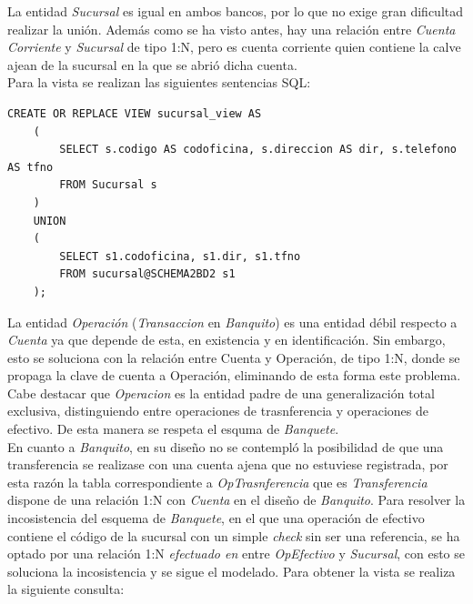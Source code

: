 \documentclass{article}
\begin{document}
La entidad \textit{Sucursal} es igual en ambos bancos, por lo que no exige gran dificultad realizar la unión. 
Además como se ha visto antes, hay una relación entre \textit{Cuenta Corriente} y \textit{Sucursal} de tipo 1:N, pero es cuenta corriente quien contiene la calve ajean de la sucursal en la que se abrió dicha cuenta.\\
Para la vista se realizan las siguientes sentencias SQL:
\begin{lstlisting}
CREATE OR REPLACE VIEW sucursal_view AS 
	(
		SELECT s.codigo AS codoficina, s.direccion AS dir, s.telefono AS tfno
		FROM Sucursal s
	)
	UNION
	(
		SELECT s1.codoficina, s1.dir, s1.tfno
		FROM sucursal@SCHEMA2BD2 s1
	);
\end{lstlisting}
La entidad \textit{Operación} (\textit{Transaccion} en \emph{Banquito}) es una entidad débil respecto a \textit{Cuenta} ya que depende de esta, en existencia y en identificación. Sin embargo, esto se soluciona con la relación entre Cuenta y Operación, de tipo 1:N, donde se propaga la clave de cuenta a Operación, eliminando de esta forma este problema. Cabe destacar que \textit{Operacion} es la entidad padre de una generalización total exclusiva, distinguiendo entre operaciones de trasnferencia y operaciones de efectivo. De esta manera se respeta el esquma de \emph{Banquete}. \\
En cuanto a \emph{Banquito}, en su diseño no se contempló la posibilidad de que una transferencia se realizase con una cuenta ajena que no estuviese registrada, por esta razón la tabla correspondiente a \textit{OpTrasnferencia} que es \textit{Transferencia} dispone de una relación 1:N con \textit{Cuenta} en el diseño de \emph{Banquito}. 
Para resolver la incosistencia del esquema de \emph{Banquete}, en el que una operación de efectivo contiene el código de la sucursal con un simple \textit{check} sin ser una referencia, se ha optado por una relación 1:N \textit{efectuado en } entre \textit{OpEfectivo} y \textit{Sucursal}, con esto se soluciona la incosistencia y se sigue el modelado.
Para obtener la vista se realiza la siguiente consulta:
\end{document}
